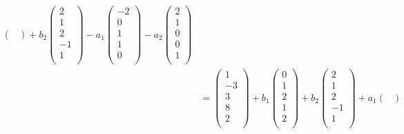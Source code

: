 \documentclass[color=black,device=normal,lang=cn,mode=geye]{elegantnote}
\begin{document}
\begin{solution}
\begin{align*}
\begin{pmatrix}
        \end{pmatrix}+b_2\begin{pmatrix}
            2 \\
            1 \\
            2 \\
            -1 \\
            1 \\
        \end{pmatrix}-a_1\begin{pmatrix}
            -2 \\
            0 \\
            1 \\
            1 \\
            0 \\
        \end{pmatrix}-a_2\begin{pmatrix}
            2 \\
            1 \\
            0 \\
            0 \\
            1 \\
        \end{pmatrix} \\
        & =\begin{pmatrix}
            1 \\
            -3 \\
            3 \\
            8 \\
            2 \\
        \end{pmatrix}+b_1\begin{pmatrix}
            0 \\
            1 \\
            2 \\
            1 \\
            2 \\
        \end{pmatrix}+b_2\begin{pmatrix}
            2 \\
            1 \\
            2 \\
            -1 \\
            1 \\
        \end{pmatrix}+a_1\begin{pmatrix}

\end{pmatrix}
\end{align*}
\end{solution}
\end{document}
